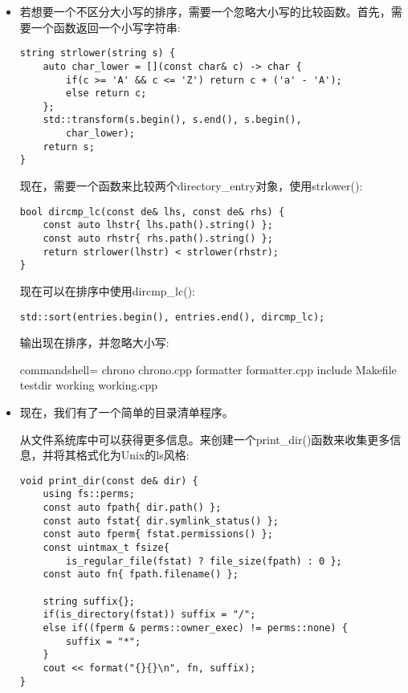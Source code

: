 \begin{itemize}
\item 
若想要一个不区分大小写的排序，需要一个忽略大小写的比较函数。首先，需要一个函数返回一个小写字符串:

\begin{lstlisting}[style=styleCXX]
string strlower(string s) {
	auto char_lower = [](const char& c) -> char {
		if(c >= 'A' && c <= 'Z') return c + ('a' - 'A');
		else return c;
	};
	std::transform(s.begin(), s.end(), s.begin(),
		char_lower);
	return s;
}
\end{lstlisting}

现在，需要一个函数来比较两个directory\_entry对象，使用strlower():

\begin{lstlisting}[style=styleCXX]
bool dircmp_lc(const de& lhs, const de& rhs) {
	const auto lhstr{ lhs.path().string() };
	const auto rhstr{ rhs.path().string() };
	return strlower(lhstr) < strlower(rhstr);
}
\end{lstlisting}

现在可以在排序中使用dircmp\_lc():

\begin{lstlisting}[style=styleCXX]
std::sort(entries.begin(), entries.end(), dircmp_lc);
\end{lstlisting}

输出现在排序，并忽略大小写:

\begin{tcblisting}{commandshell={}}
chrono chrono.cpp formatter formatter.cpp include
Makefile testdir working working.cpp
\end{tcblisting}

\item 
现在，我们有了一个简单的目录清单程序。

从文件系统库中可以获得更多信息。来创建一个print\_dir()函数来收集更多信息，并将其格式化为Unix的ls风格:

\begin{lstlisting}[style=styleCXX]
void print_dir(const de& dir) {
	using fs::perms;
	const auto fpath{ dir.path() };
	const auto fstat{ dir.symlink_status() };
	const auto fperm{ fstat.permissions() };
	const uintmax_t fsize{
		is_regular_file(fstat) ? file_size(fpath) : 0 };
	const auto fn{ fpath.filename() };
	
	string suffix{};
	if(is_directory(fstat)) suffix = "/";
	else if((fperm & perms::owner_exec) != perms::none) {
		suffix = "*";
	}
	cout << format("{}{}\n", fn, suffix);
}
\end{lstlisting}


\end{itemize}
